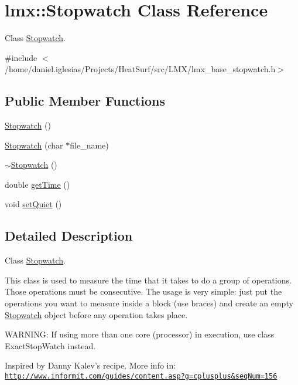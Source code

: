 \hypertarget{classlmx_1_1Stopwatch}{\section{lmx\-:\-:Stopwatch Class Reference}
\label{classlmx_1_1Stopwatch}
}


Class \hyperlink{classlmx_1_1Stopwatch}{Stopwatch}.  




{\ttfamily \#include $<$/home/daniel.\-iglesias/\-Projects/\-Heat\-Surf/src/\-L\-M\-X/lmx\-\_\-base\-\_\-stopwatch.\-h$>$}

\subsection*{Public Member Functions}
\begin{DoxyCompactItemize}
\item 
\hyperlink{classlmx_1_1Stopwatch_ae62ceeec915247ff0d92de3f02abf7c2}{Stopwatch} ()
\item 
\hyperlink{classlmx_1_1Stopwatch_a9c533ef6df594d2548561c202c3184fb}{Stopwatch} (char $\ast$file\-\_\-name)
\item 
\hyperlink{classlmx_1_1Stopwatch_a173f161dbaf4d5790e4517361f358b08}{$\sim$\-Stopwatch} ()
\item 
double \hyperlink{classlmx_1_1Stopwatch_a71d629530005931376c776b32c2cff61}{get\-Time} ()
\item 
void \hyperlink{classlmx_1_1Stopwatch_adbd2c1eeef2fd57381e88c6ab6665fb2}{set\-Quiet} ()
\end{DoxyCompactItemize}


\subsection{Detailed Description}
Class \hyperlink{classlmx_1_1Stopwatch}{Stopwatch}. 

This class is used to measure the time that it takes to do a group of operations. Those operations must be consecutive. The usage is very simple\-: just put the operations you want to measure inside a block (use braces) and create an empty \hyperlink{classlmx_1_1Stopwatch}{Stopwatch} object before any operation takes place.

W\-A\-R\-N\-I\-N\-G\-: If using more than one core (processor) in execution, use class Exact\-Stop\-Watch instead.

Inspired by Danny Kalev's recipe. More info in\-: \href{http://www.informit.com/guides/content.asp?g=cplusplus&seqNum=156}{\tt http\-://www.\-informit.\-com/guides/content.\-asp?g=cplusplus\&seq\-Num=156}

